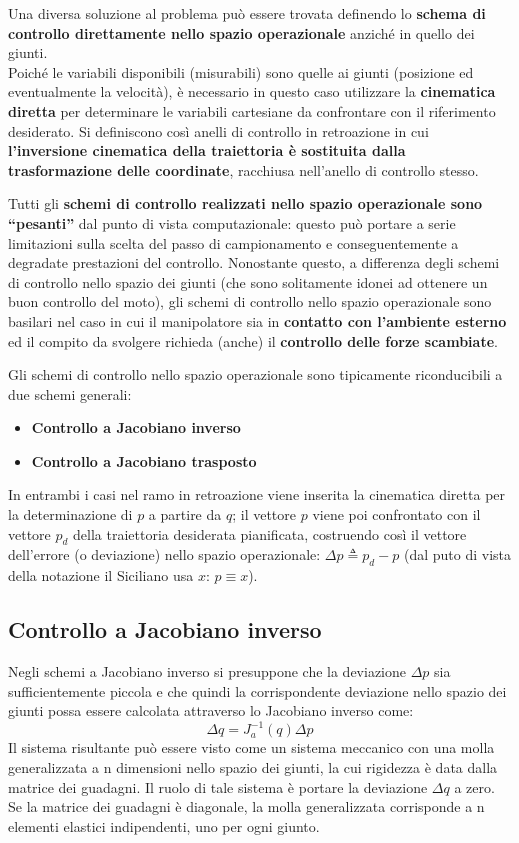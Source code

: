 Una diversa soluzione al problema può essere trovata definendo lo \textbf{schema di controllo direttamente nello spazio operazionale} anziché in quello dei giunti. \\
Poiché le variabili disponibili (misurabili) sono quelle ai giunti (posizione ed eventualmente la velocità), è necessario in questo caso utilizzare la \textbf{cinematica diretta} per determinare le variabili cartesiane da confrontare con il riferimento desiderato. Si definiscono così anelli di controllo in retroazione in cui \textbf{l’inversione cinematica della traiettoria è sostituita dalla trasformazione delle coordinate}, racchiusa nell’anello di controllo stesso.

Tutti gli \textbf{schemi di controllo realizzati nello spazio operazionale sono “pesanti”} dal punto di vista computazionale: questo può portare a serie limitazioni sulla scelta del passo di campionamento e conseguentemente a degradate prestazioni del controllo. Nonostante questo, a differenza degli schemi di controllo nello spazio dei giunti (che sono solitamente idonei ad ottenere un buon controllo del moto), gli schemi di controllo nello spazio operazionale sono basilari nel caso in cui il manipolatore sia in \textbf{contatto con l’ambiente esterno} ed il compito da svolgere richieda (anche) il \textbf{controllo delle forze scambiate}.

Gli schemi di controllo nello spazio operazionale sono tipicamente riconducibili a due schemi generali:
\begin{itemize}
	\item \textbf{Controllo a Jacobiano inverso}
	\item \textbf{Controllo a Jacobiano trasposto}
\end{itemize}

\boldmath
In entrambi i casi nel ramo in retroazione viene inserita la cinematica diretta per la determinazione di $p$ a partire da $q$; il vettore $p$ viene poi confrontato con il vettore $p_d$ della traiettoria desiderata pianificata, costruendo così il vettore dell’errore (o deviazione) nello spazio operazionale: $\Delta p \triangleq p_d - p$ (dal puto di vista della notazione il Siciliano usa $x$: $p \equiv x$).






\subsection{Controllo a Jacobiano inverso}
Negli schemi a Jacobiano inverso si presuppone che la deviazione $\Delta p$ sia sufficientemente piccola e che quindi la corrispondente deviazione nello spazio dei giunti possa essere calcolata attraverso lo Jacobiano inverso come:
$$
\Delta q = J_a^{-1}(q) \Delta p
$$
Il sistema risultante può essere visto come un sistema meccanico con una molla generalizzata a n dimensioni nello spazio dei giunti, la cui rigidezza è data dalla matrice dei guadagni. Il ruolo di tale sistema è portare la deviazione $\Delta q$ a zero. Se la matrice dei guadagni è diagonale, la molla generalizzata corrisponde a n elementi elastici indipendenti, uno per ogni giunto.

